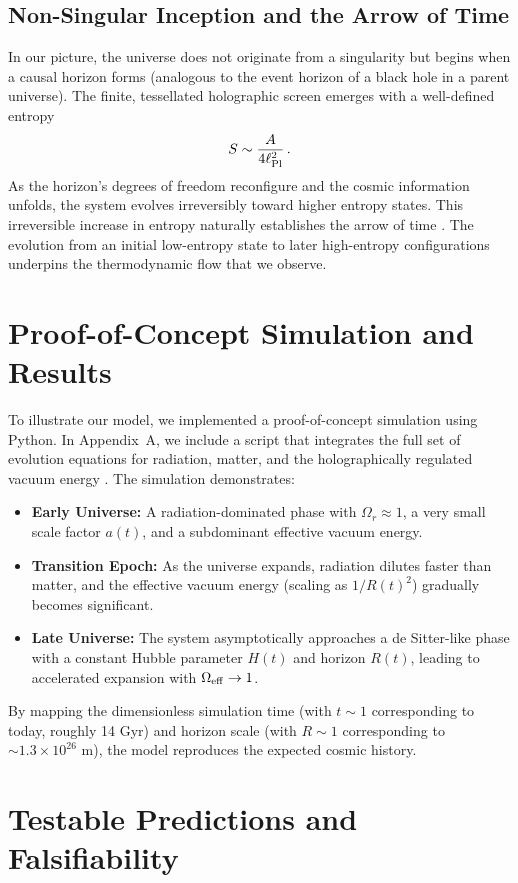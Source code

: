 \documentclass[12pt]{article}
\begin{document}
\subsection{Non-Singular Inception and the Arrow of Time}
In our picture, the universe does not originate from a singularity but begins when a causal horizon forms (analogous to the event horizon of a black hole in a parent universe). The finite, tessellated holographic screen emerges with a well-defined entropy \cite{Bekenstein1975,Hawking1976}
\[
S \sim \frac{A}{4\ell_{\rm Pl}^2}\,.
\]
As the horizon's degrees of freedom reconfigure and the cosmic information unfolds, the system evolves irreversibly toward higher entropy states. This irreversible increase in entropy naturally establishes the arrow of time \cite{Carroll2010}. The evolution from an initial low-entropy state to later high-entropy configurations underpins the thermodynamic flow that we observe.

\section{Proof-of-Concept Simulation and Results}
To illustrate our model, we implemented a proof-of-concept simulation using Python. In Appendix~A, we include a script that integrates the full set of evolution equations for radiation, matter, and the holographically regulated vacuum energy \cite{Kolb2018}. The simulation demonstrates:
\begin{itemize}
    \item \textbf{Early Universe:} A radiation-dominated phase with $\Omega_r \approx 1$, a very small scale factor $a(t)$, and a subdominant effective vacuum energy.
    \item \textbf{Transition Epoch:} As the universe expands, radiation dilutes faster than matter, and the effective vacuum energy (scaling as $1/R(t)^2$) gradually becomes significant.
    \item \textbf{Late Universe:} The system asymptotically approaches a de Sitter-like phase with a constant Hubble parameter $H(t)$ and horizon $R(t)$, leading to accelerated expansion with $\Omega_{\rm eff} \rightarrow 1$.
\end{itemize}
By mapping the dimensionless simulation time (with $t\sim 1$ corresponding to today, roughly 14 Gyr) and horizon scale (with $R\sim 1$ corresponding to $\sim 1.3\times10^{26}$ m), the model reproduces the expected cosmic history.

\section{Testable Predictions and Falsifiability}
\end{document}
